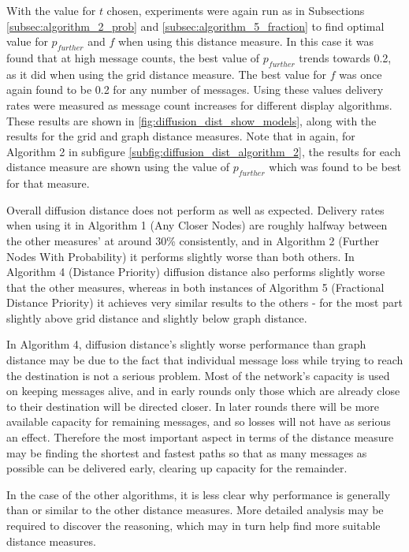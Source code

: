 \documentclass[bsc,frontabs,twoside,singlespacing,parskip,deptreport]{infthesis}     %
\begin{document}
With the value for $t$ chosen, experiments were again run as in Subsections \ref{subsec:algorithm_2_prob} and \ref{subsec:algorithm_5_fraction} to find optimal value for $p_{further}$ and $f$ when using this distance measure. In this case it was found that at high message counts, the best value of $p_{further}$ trends towards 0.2, as it did when using the grid distance measure. The best value for $f$ was once again found to be 0.2 for any number of messages. Using these values delivery rates were measured as message count increases for different display algorithms. These results are shown in \ref{fig:diffusion_dist_show_models}, along with the results for the grid and graph distance measures. Note that in again, for Algorithm 2 in subfigure \ref{subfig:diffusion_dist_algorithm_2}, the results for each distance measure are shown using the value of $p_{further}$ which was found to be best for that measure.

Overall diffusion distance does not perform as well as expected. Delivery rates when using it in Algorithm 1 (Any Closer Nodes) are roughly halfway between the other measures' at around 30\% consistently, and in Algorithm 2 (Further Nodes With Probability) it performs slightly worse than both others. In Algorithm 4 (Distance Priority) diffusion distance also performs slightly worse that the other measures, whereas in both instances of Algorithm 5 (Fractional Distance Priority) it achieves very similar results to the others - for the most part slightly above grid distance and slightly below graph distance.

In Algorithm 4, diffusion distance's slightly worse performance than graph distance may be due to the fact that individual message loss while trying to reach the destination is not a serious problem. Most of the network's capacity is used on keeping messages alive, and in early rounds only those which are already close to their destination will be directed closer. In later rounds there will be more available capacity for remaining messages, and so losses will not have as serious an effect. Therefore the most important aspect in terms of the distance measure may be finding the shortest and fastest paths so that as many messages as possible can be delivered early, clearing up capacity for the remainder.

In the case of the other algorithms, it is less clear why performance is generally than or similar to the other distance measures. More detailed analysis may be required to discover the reasoning, which may in turn help find more suitable distance measures.
\end{document}
